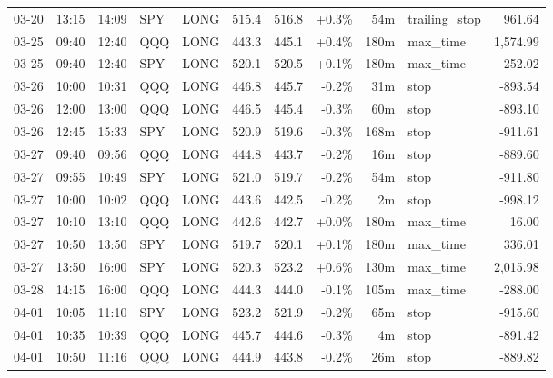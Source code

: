 \documentclass[11pt,a4paper,twoside]{article}
\begin{document}
\begin{center}
\begin{longtable}{>{\color{txtmain}}l l l l l r r r r >{\color{txtmain}}l r}
03-20 & 13:15 & 14:09 & SPY & LONG & 515.4 & 516.8 & \textcolor{wingreen}{+0.3\%} & 54m & trailing\_stop & \textcolor{wingreen}{961.64} \\
03-25 & 09:40 & 12:40 & QQQ & LONG & 443.3 & 445.1 & \textcolor{wingreen}{+0.4\%} & 180m & max\_time & \textcolor{wingreen}{1,574.99} \\
03-25 & 09:40 & 12:40 & SPY & LONG & 520.1 & 520.5 & \textcolor{wingreen}{+0.1\%} & 180m & max\_time & \textcolor{wingreen}{252.02} \\
03-26 & 10:00 & 10:31 & QQQ & LONG & 446.8 & 445.7 & \textcolor{lossred}{-0.2\%} & 31m & stop & \textcolor{lossred}{-893.54} \\
03-26 & 12:00 & 13:00 & QQQ & LONG & 446.5 & 445.4 & \textcolor{lossred}{-0.3\%} & 60m & stop & \textcolor{lossred}{-893.10} \\
03-26 & 12:45 & 15:33 & SPY & LONG & 520.9 & 519.6 & \textcolor{lossred}{-0.3\%} & 168m & stop & \textcolor{lossred}{-911.61} \\
03-27 & 09:40 & 09:56 & QQQ & LONG & 444.8 & 443.7 & \textcolor{lossred}{-0.2\%} & 16m & stop & \textcolor{lossred}{-889.60} \\
03-27 & 09:55 & 10:49 & SPY & LONG & 521.0 & 519.7 & \textcolor{lossred}{-0.2\%} & 54m & stop & \textcolor{lossred}{-911.80} \\
03-27 & 10:00 & 10:02 & QQQ & LONG & 443.6 & 442.5 & \textcolor{lossred}{-0.2\%} & 2m & stop & \textcolor{lossred}{-998.12} \\
03-27 & 10:10 & 13:10 & QQQ & LONG & 442.6 & 442.7 & \textcolor{wingreen}{+0.0\%} & 180m & max\_time & \textcolor{wingreen}{16.00} \\
03-27 & 10:50 & 13:50 & SPY & LONG & 519.7 & 520.1 & \textcolor{wingreen}{+0.1\%} & 180m & max\_time & \textcolor{wingreen}{336.01} \\
03-27 & 13:50 & 16:00 & SPY & LONG & 520.3 & 523.2 & \textcolor{wingreen}{+0.6\%} & 130m & max\_time & \textcolor{wingreen}{2,015.98} \\
03-28 & 14:15 & 16:00 & QQQ & LONG & 444.3 & 444.0 & \textcolor{lossred}{-0.1\%} & 105m & max\_time & \textcolor{lossred}{-288.00} \\
04-01 & 10:05 & 11:10 & SPY & LONG & 523.2 & 521.9 & \textcolor{lossred}{-0.2\%} & 65m & stop & \textcolor{lossred}{-915.60} \\
04-01 & 10:35 & 10:39 & QQQ & LONG & 445.7 & 444.6 & \textcolor{lossred}{-0.3\%} & 4m & stop & \textcolor{lossred}{-891.42} \\
04-01 & 10:50 & 11:16 & QQQ & LONG & 444.9 & 443.8 & \textcolor{lossred}{-0.2\%} & 26m & stop & \textcolor{lossred}{-889.82} \\

\end{longtable}
\end{center}
\end{document}
